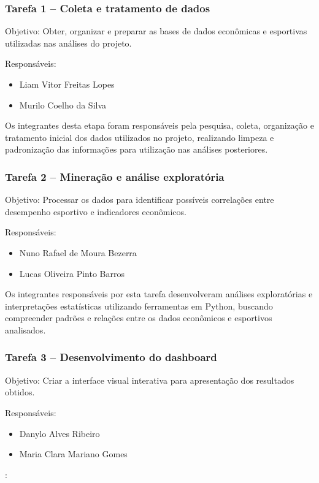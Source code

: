 \documentclass[12pt, a4paper, brazil]{article}
\begin{document}
\subsubsection{Tarefa 1 – Coleta e tratamento de dados}
Objetivo: Obter, organizar e preparar as bases de dados econômicas e esportivas utilizadas nas análises do projeto.\vspace{,5cm}

Responsáveis:
\begin{itemize}
    \item Liam Vitor Freitas Lopes
    \item Murilo Coelho da Silva
\end{itemize}


Os integrantes desta etapa foram responsáveis pela pesquisa, coleta, organização e tratamento inicial dos dados utilizados no projeto, realizando limpeza e padronização das informações para utilização nas análises posteriores.

\subsubsection{Tarefa 2 – Mineração e análise exploratória}
Objetivo: Processar os dados para identificar possíveis correlações entre desempenho esportivo e indicadores econômicos.\vspace{,5cm}

Responsáveis:
\begin{itemize}
    \item Nuno Rafael de Moura Bezerra
    \item Lucas Oliveira Pinto Barros
\end{itemize}


Os integrantes responsáveis por esta tarefa desenvolveram análises exploratórias e interpretações estatísticas utilizando ferramentas em Python, buscando compreender padrões e relações entre os dados econômicos e esportivos analisados.

\subsubsection{Tarefa 3 – Desenvolvimento do dashboard}
Objetivo: Criar a interface visual interativa para apresentação dos resultados obtidos. \vspace{,5cm}

Responsáveis:
\begin{itemize}
    \item Danylo Alves Ribeiro
    \item Maria Clara Mariano Gomes
\end{itemize}:
\end{document}
